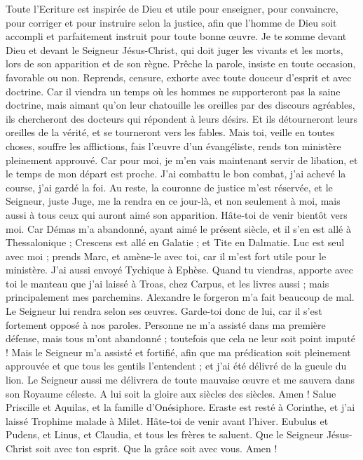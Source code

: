 \begin{multicols}{2}
Toute l'Ecriture est inspirée de Dieu et utile pour enseigner, pour convaincre, pour corriger et pour instruire selon la justice,
afin que l'homme de Dieu soit accompli et parfaitement instruit pour toute bonne œuvre.
\VerseOne{}Je te somme devant Dieu et devant le Seigneur Jésus-Christ, qui doit juger les vivants et les morts, lors de son apparition et de son règne.
Prêche la parole, insiste en toute occasion, favorable ou non. Reprends, censure, exhorte avec toute douceur d'esprit et avec doctrine.
Car il viendra un temps où les hommes ne supporteront pas la saine doctrine, mais aimant qu'on leur chatouille les oreilles par des discours agréables, ils chercheront des docteurs qui répondent à leurs désirs.
Et ils détourneront leurs oreilles de la vérité, et se tourneront vers les fables.
Mais toi, veille en toutes choses, souffre les afflictions, fais l'œuvre d'un évangéliste, rends ton ministère pleinement approuvé.
Car pour moi, je m'en vais maintenant servir de libation, et le temps de mon départ est proche.
J'ai combattu le bon combat, j'ai achevé la course, j'ai gardé la foi.
Au reste, la couronne de justice m'est réservée, et le Seigneur, juste Juge, me la rendra en ce jour-là, et non seulement à moi, mais aussi à tous ceux qui auront aimé son apparition.
Hâte-toi de venir bientôt vers moi.
Car Démas m'a abandonné, ayant aimé le présent siècle, et il s'en est allé à Thessalonique ; Crescens est allé en Galatie ; et Tite en Dalmatie.
Luc est seul avec moi ; prends Marc, et amène-le avec toi, car il m'est fort utile pour le ministère.
J'ai aussi envoyé Tychique à Ephèse.
Quand tu viendras, apporte avec toi le manteau que j'ai laissé à Troas, chez Carpus, et les livres aussi ; mais principalement mes parchemins.
Alexandre le forgeron m'a fait beaucoup de mal. Le Seigneur lui rendra selon ses œuvres.
Garde-toi donc de lui, car il s'est fortement opposé à nos paroles.
Personne ne m'a assisté dans ma première défense, mais tous m'ont abandonné ; toutefois que cela ne leur soit point imputé !
Mais le Seigneur m'a assisté et fortifié, afin que ma prédication soit pleinement approuvée et que tous les gentils l’entendent ; et j'ai été délivré de la gueule du lion.
Le Seigneur aussi me délivrera de toute mauvaise œuvre et me sauvera dans son Royaume céleste. A lui soit la gloire aux siècles des siècles. Amen !
Salue Priscille et Aquilas, et la famille d'Onésiphore.
Eraste est resté à Corinthe, et j'ai laissé Trophime malade à Milet.
Hâte-toi de venir avant l'hiver. Eubulus et Pudens, et Linus, et Claudia, et tous les frères te saluent.
Que le Seigneur Jésus-Christ soit avec ton esprit. Que la grâce soit avec vous. Amen !
\PPE{}
\end{multicols}
